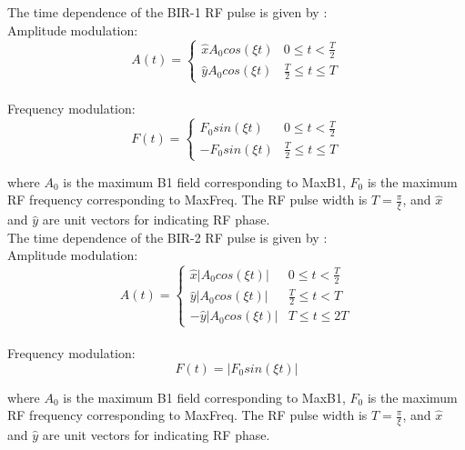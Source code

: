 \documentclass{book}%
\begin{document}
The time dependence of the BIR-1 RF pulse is given by \cite{Handbook2004}: \\
Amplitude modulation:
\begin{equation}
A(t) = 
\begin{cases}
 \hat{x} A_0 cos(\xi t)  &  0 \leq t < \frac{T}{2} \\
 \hat{y} A_0 cos(\xi t)  &  \frac{T}{2} \leq t \leq T
\end{cases}
\label{eq:BIR1A}
\end{equation}
\\
Frequency modulation:
\begin{equation}
F(t) = 
\begin{cases}
  F_0 sin(\xi t)  &  0 \leq t < \frac{T}{2} \\
 - F_0 sin(\xi t)  &  \frac{T}{2} \leq t \leq T
\end{cases}
\label{eq:BIR1F}
\end{equation}

where $A_0$ is the maximum B1 field corresponding to MaxB1, $F_0$ is the maximum RF frequency corresponding to MaxFreq. The RF pulse width is $T = \frac{\pi}{\xi}$, and $\hat{x}$ and $\hat{y}$ are unit vectors for indicating RF phase. \\

The time dependence of the BIR-2 RF pulse is given by \cite{Handbook2004}: \\
Amplitude modulation:
\begin{equation}
A(t) = 
\begin{cases}
 \hat{x} |A_0 cos(\xi t)|  &  0 \leq t < \frac{T}{2} \\
 \hat{y} |A_0 cos(\xi t)|  &  \frac{T}{2} \leq t < T \\
 -\hat{y} |A_0 cos(\xi t)|  &  T \leq t \leq 2T
\end{cases}
\label{eq:BIR2A}
\end{equation}
\\
Frequency modulation:
\begin{equation}
F(t) = |F_0 sin(\xi t)|
\label{eq:BIR2F}
\end{equation}

where $A_0$ is the maximum B1 field corresponding to MaxB1, $F_0$ is the maximum RF frequency corresponding to MaxFreq. The RF pulse width is $T = \frac{\pi}{\xi}$, and $\hat{x}$ and $\hat{y}$ are unit vectors for indicating RF phase. \\
\end{document}
